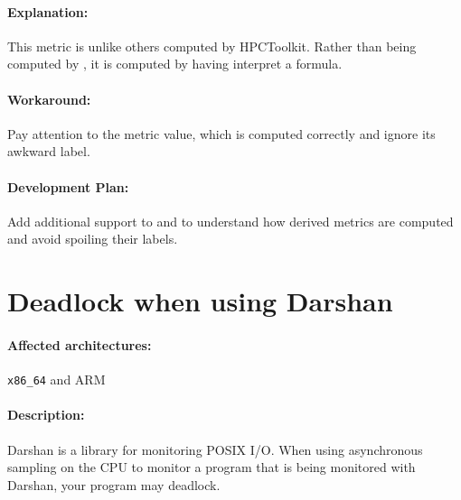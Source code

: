 \documentclass[11pt,letterpaper]{report}
\begin{document}
\paragraph{Explanation:} This metric is unlike others computed by HPCToolkit. Rather than being computed by \hpcprof{}, it is computed by having \hpcviewer{} interpret a formula. 

\paragraph{Workaround:} Pay attention to the metric value, which is computed correctly and ignore its awkward label.


\paragraph{Development Plan:}  Add additional support to  \hpcrun{} and \hpcprof{} to understand how derived metrics are computed and avoid spoiling their labels.

\section{Deadlock when using Darshan}

\paragraph{Affected architectures:}  \verb|x86_64| and ARM

\paragraph{Description:}
Darshan is a library for monitoring POSIX I/O. When using asynchronous sampling on the CPU to monitor a program that is being monitored with Darshan, your program may deadlock.
\end{document}
